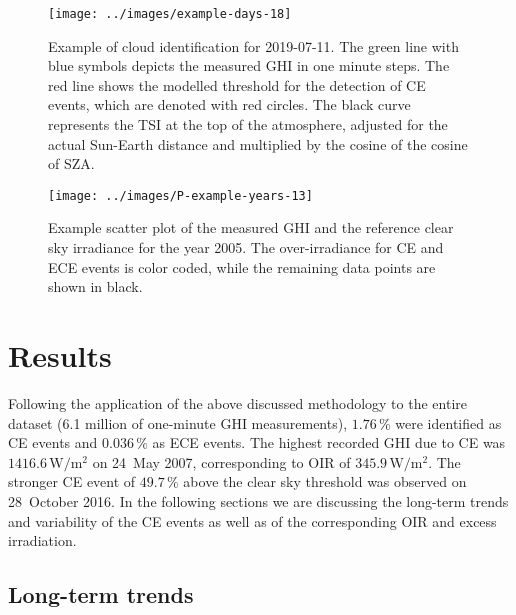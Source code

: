 \documentclass[preprint, 5p,
authoryear]{elsarticle} %
\begin{document}
\begin{figure}[H]

{\centering \texttt{[image: ../images/example-days-18]} 

}

\caption{Example of cloud identification for 2019-07-11. The green line with blue symbols depicts the measured GHI in one minute steps. The red line shows the modelled threshold for the detection of CE events, which are denoted with red circles. The black curve represents the TSI at the top of the atmosphere, adjusted for the actual Sun-Earth distance and multiplied by the cosine of the cosine of SZA.}\label{fig:example-day}
\end{figure}

\begin{figure}[H]

{\centering \texttt{[image: ../images/P-example-years-13]} 

}

\caption{Example scatter plot of the measured GHI and the reference clear sky irradiance for the year 2005. The over-irradiance for CE and ECE events is color coded, while the remaining data points are shown in black.}\label{fig:example-year}
\end{figure}

\hypertarget{results}{%
\section{Results}\label{results}}

Following the application of the above discussed methodology to the
entire dataset (6.1 million of one-minute GHI measurements),
\(1.76\,\%\) were identified as CE events and \(0.036\,\%\) as ECE
events. The highest recorded GHI due to CE was
\(1416.6\,\text{W}/\text{m}^2\) on 24~May 2007, corresponding to OIR of
\(345.9\,\text{W}/\text{m}^2\). The stronger CE event of \(49.7\,\%\)
above the clear sky threshold was observed on 28~October 2016. In the
following sections we are discussing the long-term trends and
variability of the CE events as well as of the corresponding OIR and
excess irradiation.

\hypertarget{long-term-trends}{%
\subsection{Long-term trends}\label{long-term-trends}}
\end{document}
